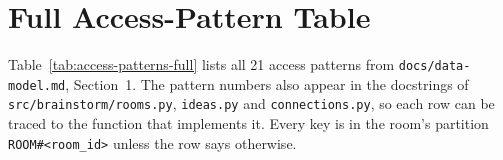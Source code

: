 
\section{Full Access-Pattern Table}\label{app:access-patterns}

Table~\ref{tab:access-patterns-full} lists all 21 access patterns from
\texttt{docs/data-model.md}, Section~1. The pattern numbers also appear in the docstrings of
\texttt{src/brainstorm/rooms.py}, \texttt{ideas.py} and \texttt{connections.py}, so each row can be
traced to the function that implements it. Every key is in the room's partition
\texttt{ROOM\#\textless room\_id\textgreater} unless the row says otherwise.

